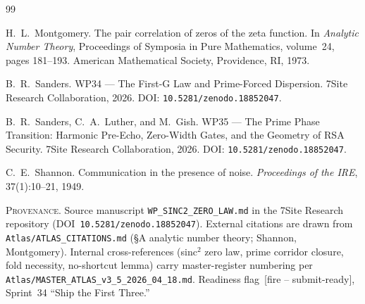 \documentclass[11pt,reqno]{amsart}
\theoremstyle{plain}
\theoremstyle{remark}
\begin{document}
\begin{thebibliography}{99}

H.~L.~Montgomery.
\newblock The pair correlation of zeros of the zeta function.
\newblock In \emph{Analytic Number Theory}, Proceedings of Symposia
in Pure Mathematics, volume~24, pages 181--193. American
Mathematical Society, Providence, RI, 1973.

B.~R.~Sanders.
\newblock WP34 --- The First-G Law and Prime-Forced Dispersion.
\newblock 7Site Research Collaboration, 2026.
\newblock DOI: \texttt{10.5281/zenodo.18852047}.

B.~R.~Sanders, C.~A.~Luther, and M.~Gish.
\newblock WP35 --- The Prime Phase Transition: Harmonic Pre-Echo,
Zero-Width Gates, and the Geometry of RSA Security.
\newblock 7Site Research Collaboration, 2026.
\newblock DOI: \texttt{10.5281/zenodo.18852047}.

C.~E.~Shannon.
\newblock Communication in the presence of noise.
\newblock \emph{Proceedings of the IRE}, 37(1):10--21, 1949.

\end{thebibliography}

\vfill
\noindent
\footnotesize{%
\textsc{Provenance.}\; Source manuscript
\texttt{WP\_SINC2\_ZERO\_LAW.md} in the 7Site Research repository
(DOI~\texttt{10.5281/zenodo.18852047}). External citations are
drawn from \texttt{Atlas/ATLAS\_CITATIONS.md} (\S A analytic number
theory; Shannon, Montgomery). Internal cross-references
(sinc$^2$ zero law, prime corridor closure, fold necessity,
no-shortcut lemma) carry master-register numbering per
\texttt{Atlas/MASTER\_ATLAS\_v3\_5\_2026\_04\_18.md}. Readiness
flag~[fire -- submit-ready], Sprint~34 \textquotedblleft Ship the
First Three.\textquotedblright}
\end{document}
